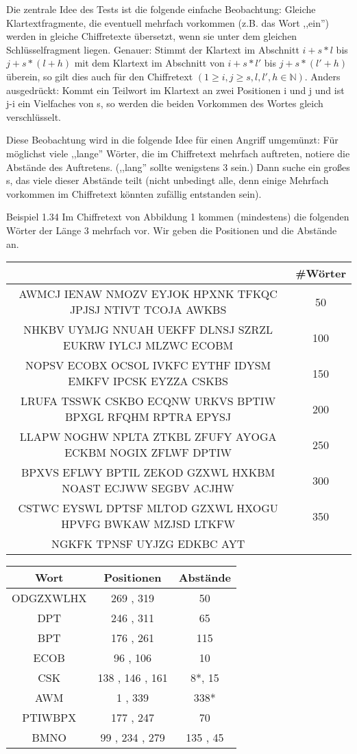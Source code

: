 \documentclass[a4paper]{article}
\begin{document}
\begin{multicols}{3}
    Die zentrale Idee des Tests ist die folgende einfache Beobachtung: Gleiche Klartextfragmente, die eventuell mehrfach vorkommen (z.B. das Wort ,,ein'') werden in gleiche Chiffretexte übersetzt, wenn sie unter dem gleichen Schlüsselfragment liegen. Genauer: Stimmt der Klartext im Abschnitt $i+s*l$ bis $j+s*(l+h)$ mit dem Klartext im Abschnitt von $i+s*l'$ bis $j+s*(l'+h)$ überein, so gilt dies auch für den Chiffretext $(1\geq i,j\geq s,l,l',h\in\mathbb{N})$.
    Anders ausgedrückt: Kommt ein Teilwort im Klartext an zwei Positionen i und j und ist j-i ein Vielfaches von s, so werden die beiden Vorkommen des Wortes gleich verschlüsselt.

    Diese Beobachtung wird in die folgende Idee für einen Angriff umgemünzt: Für möglichst viele ,,lange'' Wörter, die im Chiffretext mehrfach auftreten, notiere die Abstände des Auftretens. (,,lang'' sollte wenigstens 3 sein.) Dann suche ein großes s, das viele dieser Abstände teilt (nicht unbedingt alle, denn einige Mehrfach vorkommen im Chiffretext könnten zufällig entstanden sein).

    Beispiel 1.34 Im Chiffretext von Abbildung 1 kommen (mindestens) die folgenden Wörter der Länge 3 mehrfach vor. Wir geben die Positionen und die Abstände an.

    \begin{tabular}{c|c}
                                   & \#Wörter \\\hline
     AWMCJ IENAW NMOZV EYJOK HPXNK TFKQC JPJSJ NTIVT TCOJA AWKBS & 50   \\
     NHKBV UYMJG NNUAH UEKFF DLNSJ SZRZL EUKRW IYLCJ MLZWC ECOBM & 100   \\
     NOPSV ECOBX OCSOL IVKFC EYTHF IDYSM EMKFV IPCSK EYZZA CSKBS & 150   \\
     LRUFA TSSWK CSKBO ECQNW URKVS BPTIW BPXGL RFQHM RPTRA EPYSJ & 200   \\
     LLAPW NOGHW NPLTA ZTKBL ZFUFY AYOGA ECKBM NOGIX ZFLWF DPTIW & 250   \\
     BPXVS EFLWY BPTIL ZEKOD GZXWL HXKBM NOAST ECJWW SEGBV ACJHW & 300   \\
     CSTWC EYSWL DPTSF MLTOD GZXWL HXOGU HPVFG BWKAW MZJSD LTKFW & 350   \\
     NGKFK TPNSF UYJZG EDKBC AYT                 
    \end{tabular}
    \begin{tabular}{c|c|c}
    Wort   & Positionen   & Abstände \\\hline
     ODGZXWLHX & 269 , 319    & 50    \\
     DPT    & 246 , 311    & 65    \\
     BPT    & 176 , 261    & 115   \\
     ECOB   & 96 , 106    & 10    \\
     CSK    & 138 , 146 , 161 & 8*, 15  \\
     AWM    & 1 , 339     & 338*   \\
     PTIWBPX  & 177 , 247    & 70    \\
     BMNO   & 99 , 234 , 279 & 135 , 45 
\end{tabular}


\end{multicols}
\end{document}
